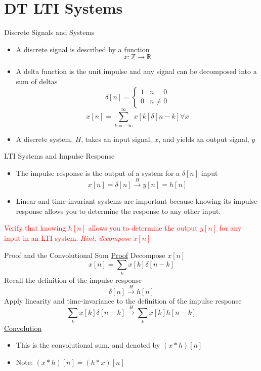 \section{DT LTI Systems}

\begin{frame}{Discrete Signals and Systems}

    \begin{itemize}
        \item A discrete signal is described by a function
            \[
                x: \mathbb{Z} \rightarrow \mathbb{R}
            \]
        \item A delta function is the unit impulse and any signal can be decomposed into a sum of deltas
            \[
                \delta[n] =
                \begin{cases}
                    1 & n= 0 \\
                    0 & n\ne 0
                \end{cases}
            \]
            \[
                x[n] = \sum_{k=-\infty}^{\infty} x[k]\delta[n-k] \forall x
            \]
        \item A discrete system, $H$, takes an input signal, $x$, and yields an output signal, $y$
    \end{itemize}
\end{frame}

\begin{frame}{LTI Systems and Impulse Response}
\begin{itemize}
    \item The impulse response is the output of a system for a $\delta[n]$ input
    \[
        x[n] = \delta[n] \overset{H}{\longrightarrow} y[n] = h[n]
    \]
    \item Linear and time-invariant systems are important because knowing its impulse response allows you to determine the response to any other input.
\end{itemize}

\vspace{20px}

\textcolor{red}{Verify that knowing $h[n]$ allows you to determine the output $y[n]$ for any input in an LTI system. \textit{Hint: decompose $x[n]$}}

\end{frame}

\begin{frame}{Proof and the Convolutional Sum}
    \underline{Proof}
    Decompose $x[n]$
    \[x[n] = \sum_k x[k]\delta[n-k]\]
    Recall the definition of the impulse response
    \[\delta[n] \overset{H}{\longrightarrow} h[n]\]
    Apply linearity and time-invariance to the definition of the impulse response
    \[\sum_k x[k]\delta[n-k] \overset{H}{\longrightarrow} \sum_k x[k]h[n-k]\]
    \underline{Convolution}
\begin{itemize}
    \item This is the convolutional sum, and denoted by $(x * h)[n]$
    \item Note: $(x * h)[n] = (h * x)[n]$
\end{itemize}
\end{frame}


